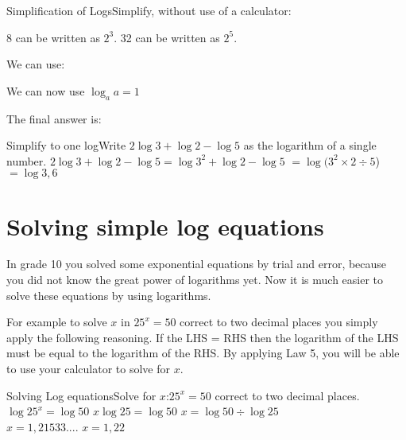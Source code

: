 \begin{wex}{Simplification of Logs}{Simplify, without use of a calculator:
}
{
8 can be written as $2^3$. 32 can be written as $2^5$.


We can use:


We can now use $\log_a a =1$


The final answer is:
}
\end{wex}



\begin{wex}{Simplify to one log}{Write $2\log {3} + \log {2} -\log {5}$ as the logarithm of a single number.}{
$2\log {3} + \log {2} -\log {5} = \log {3^2} + \log {2} -\log {5}$
$= \log ({3}^2\times 2 \div 5$)
$= \log {3,6}$
}
\end{wex}


\section{Solving simple log equations}

In grade 10 you solved some exponential equations by trial and error, because you did not know the great power of logarithms yet.  Now it is much easier to solve these equations by using logarithms.

For example to solve $x$ in $25^x = 50$ correct to two decimal places you simply apply the following reasoning.  If the LHS = RHS then the logarithm of the LHS must be equal to the logarithm of the RHS.  By applying Law 5, you will be able to use your calculator to solve for $x$.

\begin{wex}{Solving Log equations}{Solve for $x$:\quad $25^x = 50$ correct to two decimal places.}{
$\log{25^x} = \log{50}$
$x \log{25} = \log{50}$
$x = \log{50} \div \log{25}$\\
$x = 1,21533....$
$x=1,22$
}
\end{wex}

